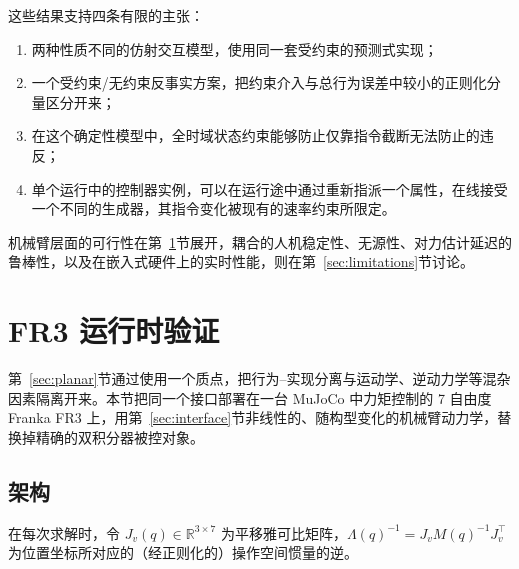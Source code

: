 \documentclass[journal]{IEEEtran}
\begin{document}
这些结果支持四条有限的主张：
\begin{enumerate}
\item 两种性质不同的仿射交互模型，使用同一套受约束的预测式实现；
\item 一个受约束/无约束反事实方案，把约束介入与总行为误差中较小的正则化分量区分开来；
\item 在这个确定性模型中，全时域状态约束能够防止仅靠指令截断无法防止的违反；
\item 单个运行中的控制器实例，可以在运行途中通过重新指派一个属性，在线接受一个不同的生成器，其指令变化被现有的速率约束所限定。
\end{enumerate}
机械臂层面的可行性在第~\ref{sec:fr3}节展开，耦合的人机稳定性、无源性、对力估计延迟的鲁棒性，以及在嵌入式硬件上的实时性能，则在第~\ref{sec:limitations}节讨论。

\section{FR3 运行时验证}
\label{sec:fr3}

第~\ref{sec:planar}节通过使用一个质点，把行为--实现分离与运动学、逆动力学等混杂因素隔离开来。本节把同一个接口部署在一台 MuJoCo 中力矩控制的 7 自由度 Franka FR3 上，用第~\ref{sec:interface}节非线性的、随构型变化的机械臂动力学，替换掉精确的双积分器被控对象。

\subsection{架构}
\label{sec:fr3-architecture}

在每次求解时，令 $J_v(q)\in\mathbb R^{3\times7}$ 为平移雅可比矩阵，$\Lambda(q)^{-1}=J_vM(q)^{-1}J_v^\top$ 为位置坐标所对应的（经正则化的）操作空间惯量的逆。
\end{document}
